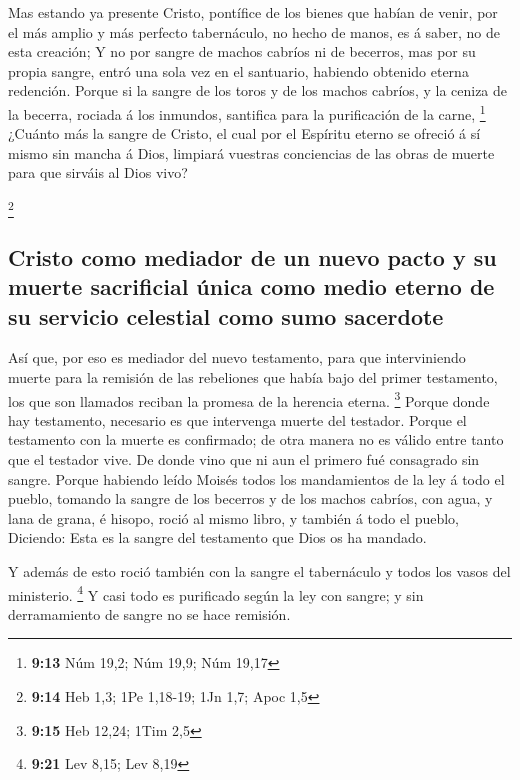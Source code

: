  Mas estando ya presente Cristo, pontífice de los bienes
que habían de venir, por el más amplio y más perfecto tabernáculo, no
hecho de manos, es á saber, no de esta creación;  Y no por
sangre de machos cabríos ni de becerros, mas por su propia sangre, entró
una sola vez en el santuario, habiendo obtenido eterna redención.
 Porque si la sangre de los toros y de los machos cabríos,
y la ceniza de la becerra, rociada á los inmundos, santifica para la
purificación de la carne, \footnote{\textbf{9:13} Núm 19,2; Núm 19,9;
  Núm 19,17}  ¿Cuánto más la sangre de Cristo, el cual por
el Espíritu eterno se ofreció á sí mismo sin mancha á Dios, limpiará
vuestras conciencias de las obras de muerte para que sirváis al Dios
vivo?

\footnote{\textbf{9:14} Heb 1,3; 1Pe 1,18-19; 1Jn 1,7; Apoc 1,5}

\hypertarget{cristo-como-mediador-de-un-nuevo-pacto-y-su-muerte-sacrificial-uxfanica-como-medio-eterno-de-su-servicio-celestial-como-sumo-sacerdote}{%
\subsection{Cristo como mediador de un nuevo pacto y su muerte
sacrificial única como medio eterno de su servicio celestial como sumo
sacerdote}\label{cristo-como-mediador-de-un-nuevo-pacto-y-su-muerte-sacrificial-uxfanica-como-medio-eterno-de-su-servicio-celestial-como-sumo-sacerdote}}

 Así que, por eso es mediador del nuevo testamento, para
que interviniendo muerte para la remisión de las rebeliones que había
bajo del primer testamento, los que son llamados reciban la promesa de
la herencia eterna. \footnote{\textbf{9:15} Heb 12,24; 1Tim 2,5}
 Porque donde hay testamento, necesario es que intervenga
muerte del testador.  Porque el testamento con la muerte es
confirmado; de otra manera no es válido entre tanto que el testador
vive.  De donde vino que ni aun el primero fué consagrado
sin sangre.  Porque habiendo leído Moisés todos los
mandamientos de la ley á todo el pueblo, tomando la sangre de los
becerros y de los machos cabríos, con agua, y lana de grana, é hisopo,
roció al mismo libro, y también á todo el pueblo, 
Diciendo: Esta es la sangre del testamento que Dios os ha mandado.

 Y además de esto roció también con la sangre el
tabernáculo y todos los vasos del ministerio. \footnote{\textbf{9:21}
  Lev 8,15; Lev 8,19}  Y casi todo es purificado según la
ley con sangre; y sin derramamiento de sangre no se hace remisión.


